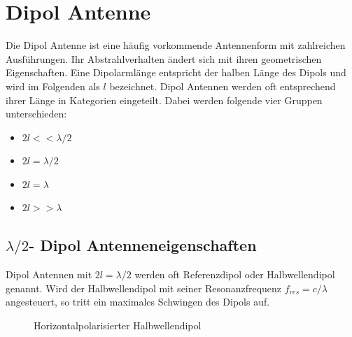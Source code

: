 \section{Dipol Antenne}
Die Dipol Antenne ist eine häufig vorkommende Antennenform  mit zahlreichen Ausführungen. Ihr Abstrahlverhalten ändert sich mit ihren geometrischen Eigenschaften. Eine Dipolarmlänge entspricht der halben Länge des Dipols und wird im Folgenden als $l$ bezeichnet. Dipol Antennen werden oft entsprechend ihrer Länge in Kategorien eingeteilt. Dabei werden folgende vier Gruppen unterschieden:
\begin{itemize}
\item $2l<< \lambda/2 $
\item $2l = \lambda/2 $
\item $2l = \lambda $
\item $2l>> \lambda $
\end{itemize} 
\subsection{$\lambda/2$- Dipol Antenneneigenschaften}
Dipol Antennen mit $2l=\lambda/2$ werden oft Referenzdipol oder Halbwellendipol genannt. Wird der Halbwellendipol mit seiner Resonanzfrequenz $f_{res}=c/\lambda$ angesteuert, so tritt ein maximales Schwingen des Dipols auf. 

\begin{figure}[!ht]%
	\begin{center}
	\end{center}
\caption{Horizontalpolarisierter Halbwellendipol}
\label{fig:HalbWellenDipolHorizontal}
\end{figure}

